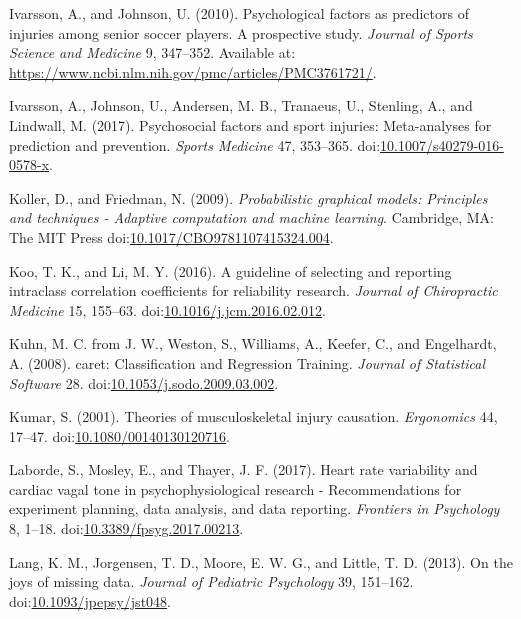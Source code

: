 \documentclass[utf8]{frontiersHLTH}
\begin{document}
\leavevmode\hypertarget{ref-Ivarsson2010}{}%
Ivarsson, A., and Johnson, U. (2010). Psychological factors as
predictors of injuries among senior soccer players. A prospective study.
\emph{Journal of Sports Science and Medicine} 9, 347--352. Available at:
\url{https://www.ncbi.nlm.nih.gov/pmc/articles/PMC3761721/}.

\leavevmode\hypertarget{ref-Ivarsson2017}{}%
Ivarsson, A., Johnson, U., Andersen, M. B., Tranaeus, U., Stenling, A.,
and Lindwall, M. (2017). Psychosocial factors and sport injuries:
Meta-analyses for prediction and prevention. \emph{Sports Medicine} 47,
353--365.
doi:\href{https://doi.org/10.1007/s40279-016-0578-x}{10.1007/s40279-016-0578-x}.

\leavevmode\hypertarget{ref-Koller2009}{}%
Koller, D., and Friedman, N. (2009). \emph{Probabilistic graphical
models: Principles and techniques - Adaptive computation and machine
learning}. Cambridge, MA: The MIT Press
doi:\href{https://doi.org/10.1017/CBO9781107415324.004}{10.1017/CBO9781107415324.004}.

\leavevmode\hypertarget{ref-Koo2016}{}%
Koo, T. K., and Li, M. Y. (2016). A guideline of selecting and reporting
intraclass correlation coefficients for reliability research.
\emph{Journal of Chiropractic Medicine} 15, 155--63.
doi:\href{https://doi.org/10.1016/j.jcm.2016.02.012}{10.1016/j.jcm.2016.02.012}.

\leavevmode\hypertarget{ref-Kuhn2008}{}%
Kuhn, M. C. from J. W., Weston, S., Williams, A., Keefer, C., and
Engelhardt, A. (2008). caret: Classification and Regression Training.
\emph{Journal of Statistical Software} 28.
doi:\href{https://doi.org/10.1053/j.sodo.2009.03.002}{10.1053/j.sodo.2009.03.002}.

\leavevmode\hypertarget{ref-Kumar2001}{}%
Kumar, S. (2001). Theories of musculoskeletal injury causation.
\emph{Ergonomics} 44, 17--47.
doi:\href{https://doi.org/10.1080/00140130120716}{10.1080/00140130120716}.

\leavevmode\hypertarget{ref-Laborde2017}{}%
Laborde, S., Mosley, E., and Thayer, J. F. (2017). Heart rate
variability and cardiac vagal tone in psychophysiological research -
Recommendations for experiment planning, data analysis, and data
reporting. \emph{Frontiers in Psychology} 8, 1--18.
doi:\href{https://doi.org/10.3389/fpsyg.2017.00213}{10.3389/fpsyg.2017.00213}.

\leavevmode\hypertarget{ref-Lang2014}{}%
Lang, K. M., Jorgensen, T. D., Moore, E. W. G., and Little, T. D.
(2013). On the joys of missing data. \emph{Journal of Pediatric
Psychology} 39, 151--162.
doi:\href{https://doi.org/10.1093/jpepsy/jst048}{10.1093/jpepsy/jst048}.
\end{document}
